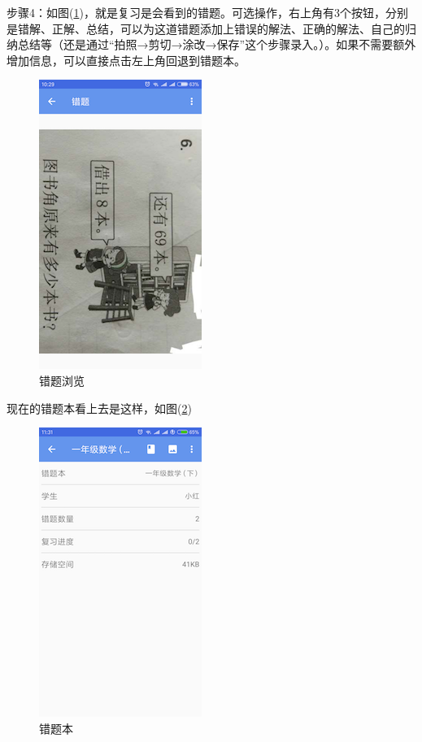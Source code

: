 步骤4：如图(\ref{img22})，就是复习是会看到的错题。可选操作，右上角有3个按钮，分别是错解、正解、总结，可以为这道错题添加上错误的解法、正确的解法、自己的归纳总结等（还是通过“拍照→剪切→涂改→保存”这个步骤录入。）。如果不需要额外增加信息，可以直接点击左上角回退到错题本。
\begin{figure}[H]
	\centering
	\includegraphics{img/22.png}
	\caption{错题浏览}
	\label{img22}
\end{figure}

现在的错题本看上去是这样，如图(\ref{img23})
\begin{figure}[H]
	\centering
	\includegraphics{img/23.png}
	\caption{错题本}
	\label{img23}
\end{figure}

